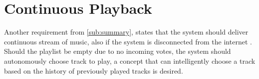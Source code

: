 \section{Continuous Playback}

Another requirement from \cref{sub:summary}, states that the system should deliver continuous stream of music, also if the system is disconnected from the internet . Should the playlist be empty due to no incoming votes, the system should autonomously choose track to play, a concept that can intelligently choose a track based on the history of previously played tracks is desired.
